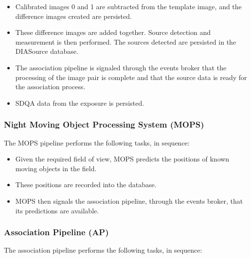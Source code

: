 \begin{itemize}
\item Calibrated images 0 and 1 are subtracted from the template
image, and the difference images created are persisted.

\item These difference images are added together. Source detection
and measurement is then performed. The sources detected are
persisted in the DIASource database.

\item The association pipeline is signaled through the events broker
that the processing of the image pair is complete and that the source
data is ready for the association process.

\item SDQA data from the exposure is persisted.

\end{itemize}

\subsubsection{Night Moving Object Processing System (MOPS)}

The MOPS pipeline performs the following tasks, in sequence:

\begin{itemize}

\item Given the required field of view, MOPS predicts the positions 
of known moving objects in the field.

\item These positions are recorded into the database.

\item MOPS then signals the association pipeline, through the events
broker, that its predictions are available.

\end{itemize}

\subsubsection{Association Pipeline (AP)}

The association pipeline performs the following tasks, in sequence:

